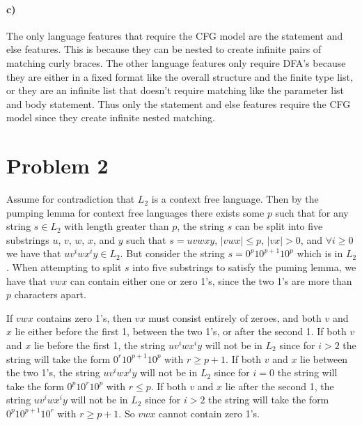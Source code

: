 \documentclass[12pt]{article}
\begin{document}
\paragraph{c)}

The only language features that require the CFG model are the statement and else features. This is because
they can be nested to create infinite pairs of matching curly braces. The other language features only require
DFA's because they are either in a fixed format like the overall structure and the finite type list, or they are
an infinite list that doesn't require matching like the parameter list and body statement. Thus only the statement
and else features require the CFG model since they create infinite nested matching.

\section*{Problem 2}

Assume for contradiction that \(L_2\) is a context free language. Then by the pumping lemma for context free languages
there exists some \(p\) such that for any string \(s\in L_2\) with length greater than \(p\), the string \(s\) can be
split into five substrings \(u\), \(v\), \(w\), \(x\), and \(y\) such that \(s=uvwxy\), \(|vwx|\leq p\), \(|vx|>0\), and
\(\forall i\geq 0\) we have that \(uv^iwx^iy\in L_2\). But consider the string \(s=0^p10^{p+1}10^p\) which is in \(L_2\). When
attempting to split \(s\) into five substrings to satisfy the puming lemma, we have that \(vwx\) can contain either one or zero
1's, since the two 1's are more than \(p\) characters apart.

If \(vwx\) contains zero 1's, then \(vx\) must consist entirely of zeroes, and both \(v\) and \(x\) lie either before the
first 1, between the two 1's, or after the second 1. If both \(v\) and \(x\) lie before the first 1, the string \(uv^iwx^iy\)
will not be in \(L_2\) since for \(i>2\) the string will take the form \(0^r10^{p+1}10^p\) with \(r\geq p+1\). If both \(v\)
and \(x\) lie between the two 1's, the string \(uv^iwx^iy\) will not be in \(L_2\) since for \(i=0\) the string will take
the form \(0^p10^r10^p\) with \(r\leq p\). If both \(v\) and \(x\) lie after the second 1, the string \(uv^iwx^iy\) will
not be in \(L_2\) since for \(i>2\) the string will take the form \(0^p10^{p+1}10^r\) with \(r\geq p+1\). So \(vwx\) cannot contain
zero 1's.
\end{document}
